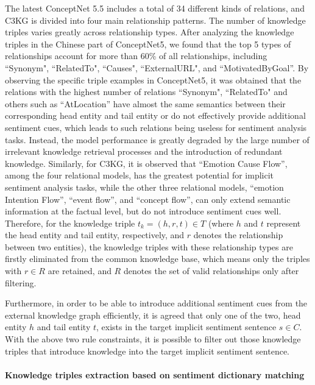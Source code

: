The latest ConceptNet 5.5 includes a total of 34 different kinds of relations, and C3KG is divided into four main relationship patterns. The number of knowledge triples varies greatly across relationship types.
After analyzing the knowledge triples in the Chinese part of ConceptNet5, we found that the top 5 types of relationships account for more than 60\% of all relationships, including ``Synonym", ``RelatedTo", ``Causes", ``ExternalURL", and ``MotivatedByGoal''.
By observing the specific triple examples in ConceptNet5, it was obtained that the relations with the highest number of relations ``Synonym", ``RelatedTo" and others such as ``AtLocation'' have almost the same semantics between their corresponding head entity and tail entity or do not effectively provide additional sentiment cues, which leads to such relations being useless for sentiment analysis tasks. Instead, the model performance is greatly degraded by the large number of irrelevant knowledge retrieval processes and the introduction of redundant knowledge.
Similarly, for C3KG, it is observed that ``Emotion Cause Flow'', among the four relational models, has the greatest potential for implicit sentiment analysis tasks, while the other three relational models, ``emotion Intention Flow'', ``event flow'', and ``concept flow'', can only extend semantic information at the factual level, but do not introduce sentiment cues well.
Therefore, for the knowledge triple $t_k = (h, r, t) \in T$ (where $h$ and $t$ represent the head entity and tail entity, respectively, and $r$ denotes the relationship between two entities), the knowledge triples with these relationship types are firstly eliminated from the common knowledge base, which means only the triples with $ r \in R $ are retained, and $R$ denotes the set of valid relationships only after filtering.

Furthermore, in order to be able to introduce additional sentiment cues from the external knowledge graph efficiently, it is agreed that only one of the two, head entity $h$ and tail entity $t$, exists in the target implicit sentiment sentence $s \in C$.
With the above two rule constraints, it is possible to filter out those knowledge triples that introduce knowledge into the target implicit sentiment sentence.

\paragraph{Knowledge triples extraction based on sentiment dictionary matching}



